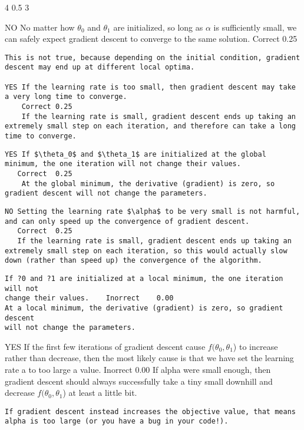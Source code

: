 \documentclass[]{article}
\begin{document}
4
0.5
3

NO No matter how $\theta_0$ and $\theta_1$ are initialized, so long as $\alpha$ is sufficiently small, we 
can safely expect gradient descent to converge to the same solution.	
Correct	0.25	

\begin{verbatim}
This is not true, because depending on the initial condition, gradient descent may end up at different local optima.

YES If the learning rate is too small, then gradient descent may take a very long time to converge.	
    Correct	0.25	
    If the learning rate is small, gradient descent ends up taking an extremely small step on each iteration, and therefore can take a long time to converge.
\end{verbatim}
\begin{verbatim}
YES If $\theta_0$ and $\theta_1$ are initialized at the global minimum, the one iteration will not change their values.	
   Correct	0.25	
    At the global minimum, the derivative (gradient) is zero, so gradient descent will not change the parameters.
\end{verbatim}
\begin{verbatim}
NO Setting the learning rate $\alpha$ to be very small is not harmful, and can only speed up the convergence of gradient descent.	
   Correct	0.25	
   If the learning rate is small, gradient descent ends up taking an extremely small step on each iteration, so this would actually slow down (rather than speed up) the convergence of the algorithm.
\end{verbatim}
\begin{verbatim}
If ?0 and ?1 are initialized at a local minimum, the one iteration will not 
change their values.	Inorrect	0.00	
At a local minimum, the derivative (gradient) is zero, so gradient descent 
will not change the parameters.
\end{verbatim}

YES If the first few iterations of gradient descent cause $f(\theta_0,\theta_1$) to increase rather than decrease, then the most likely cause is that we have set the learning rate a to too large a value.	Inorrect	0.00	If alpha were small enough, then gradient descent should always successfully take a tiny small downhill and decrease $f(\theta_0,\theta_1$) at least a little bit. 
\begin{verbatim}
If gradient descent instead increases the objective value, that means alpha is too large (or you have a bug in your code!).
\end{verbatim}
\end{document}
